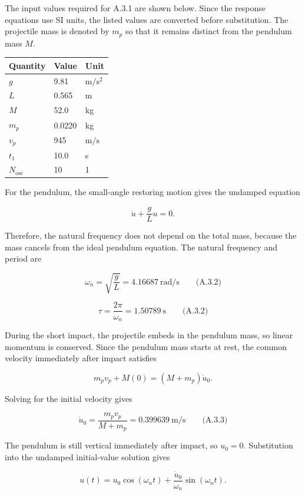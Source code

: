 The input values required for A.3.1 are shown below. Since the response equations use SI units, the listed values are converted before substitution. The projectile mass is denoted by \(m_p\) so that it remains distinct from the pendulum mass \(M\).

{ %
\begin{center}\small\begin{tabular}{@{}lll@{}}
\toprule\noalign{}
Quantity & Value & Unit \\
\midrule\noalign{}
\(g\) & 9.81 & \(\mathrm{m}/\mathrm{s}^{2}\) \\
\(L\) & 0.565 & m \\
\(M\) & 52.0 & kg \\
\(m_p\) & 0.0220 & kg \\
\(v_p\) & 945 & \(\mathrm{m}/\mathrm{s}\) \\
\(t_1\) & 10.0 & s \\
\(N_{\mathrm{osc}}\) & 10 & 1 \\
\bottomrule\end{tabular}\end{center}
}

For the pendulum, the small-angle restoring motion gives the undamped equation

\[\ddot{u}+\frac{g}{L}u=0.\]

Therefore, the natural frequency does not depend on the total mass, because the mass cancels from the ideal pendulum equation. The natural frequency and period are

\[\boxed{\omega_n=\sqrt{\frac{g}{L}}=4.16687\ \mathrm{rad}/\mathrm{s}}\qquad\text{(A.3.2)}\]

\[\boxed{\tau=\frac{2\pi}{\omega_n}=1.50789\ \mathrm{s}}\qquad\text{(A.3.2)}\]

During the short impact, the projectile embeds in the pendulum mass, so linear momentum is conserved. Since the pendulum mass starts at rest, the common velocity immediately after impact satisfies

\[m_pv_p+M(0)=(M+m_p)\dot{u}_0.\]

Solving for the initial velocity gives

\[\boxed{\dot{u}_0=\frac{m_pv_p}{M+m_p}=0.399639\ \mathrm{m}/\mathrm{s}}\qquad\text{(A.3.3)}\]

The pendulum is still vertical immediately after impact, so \(u_0=0\). Substitution into the undamped initial-value solution gives

\[u(t)=u_0\cos(\omega_nt)+\frac{\dot{u}_0}{\omega_n}\sin(\omega_nt).\]


